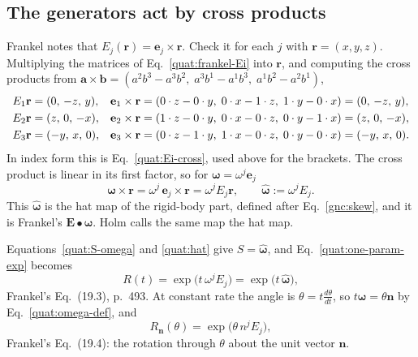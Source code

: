 \subsection{The generators act by cross products}
Frankel notes that $E_j(\mathbf r)=\mathbf e_j\times\mathbf r$. Check it
for each $j$ with $\mathbf r=(x,y,z)$. Multiplying the matrices of
Eq.~\eqref{quat:frankel-Ei} into $\mathbf r$, and computing the cross
products from $\mathbf a\times\mathbf b=(a^2b^3-a^3b^2,\;a^3b^1-a^1b^3,\;
a^1b^2-a^2b^1)$,
\begin{align}
 E_1\mathbf r&=(0,\,-z,\,y),&
 \mathbf e_1\times\mathbf r&=(0\cdot z-0\cdot y,\;0\cdot x-1\cdot z,\;
   1\cdot y-0\cdot x)=(0,\,-z,\,y),\notag\\
 E_2\mathbf r&=(z,\,0,\,-x),&
 \mathbf e_2\times\mathbf r&=(1\cdot z-0\cdot y,\;0\cdot x-0\cdot z,\;
   0\cdot y-1\cdot x)=(z,\,0,\,-x),\notag\\
 E_3\mathbf r&=(-y,\,x,\,0),&
 \mathbf e_3\times\mathbf r&=(0\cdot z-1\cdot y,\;1\cdot x-0\cdot z,\;
   0\cdot y-0\cdot x)=(-y,\,x,\,0).\label{quat:Ej-explicit}
\end{align}
In index form this is Eq.~\eqref{quat:Ei-cross}, used above for the
brackets. The cross product is
linear in its first factor, so for $\boldsymbol\omega=\omega^j\mathbf e_j$
\begin{equation}\label{quat:hat}
 \boldsymbol\omega\times\mathbf r=\omega^j\,\mathbf e_j\times\mathbf r
 =\omega^jE_j\mathbf r ,\qquad
 \widehat{\boldsymbol\omega}:=\omega^jE_j .
\end{equation}
This $\widehat{\boldsymbol\omega}$ is the hat map of the rigid-body part,
defined after Eq.~\eqref{gnc:skew}, and it is Frankel's
$\mathbf E\bullet\boldsymbol\omega$. Holm calls the same map the hat map.

Equations~\eqref{quat:S-omega} and \eqref{quat:hat} give
$S=\widehat{\boldsymbol\omega}$, and Eq.~\eqref{quat:one-param-exp} becomes
\begin{equation}\label{quat:frankel-19-3}
 R(t)=\exp\bigl(t\,\omega^jE_j\bigr)=\exp\bigl(t\,\widehat{\boldsymbol\omega}\bigr),
\end{equation}
Frankel's Eq.~(19.3), p.~493. At constant rate the angle is
$\theta=t\frac{d\theta}{dt}$, so $t\boldsymbol\omega=\theta\mathbf n$ by
Eq.~\eqref{quat:omega-def}, and
\begin{equation}\label{quat:frankel-19-4}
 R_{\mathbf n}(\theta)=\exp\bigl(\theta\,n^jE_j\bigr),
\end{equation}
Frankel's Eq.~(19.4): the rotation through $\theta$ about the unit vector
$\mathbf n$.

